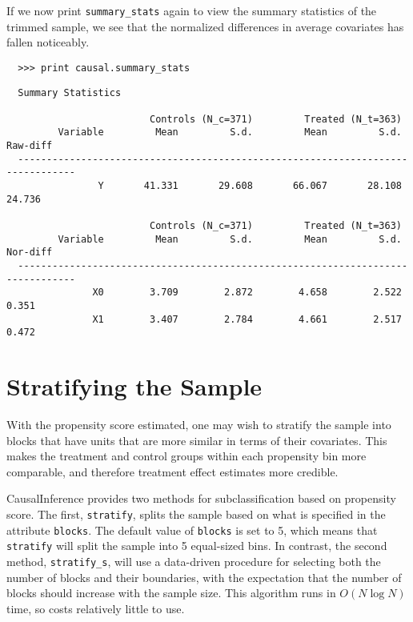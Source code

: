 \documentclass[12pt]{article}
\theoremstyle{definition}
\theoremstyle{definition}
\theoremstyle{definition}
\theoremstyle{remark}
\begin{document}
If we now print \texttt{summary\_stats} again to view the summary statistics of the trimmed sample, we see that the normalized differences in average covariates has fallen noticeably.
\begin{verbatim}
  >>> print causal.summary_stats
\end{verbatim}
\begin{verbatim}
  Summary Statistics
  
                         Controls (N_c=371)         Treated (N_t=363)             
         Variable         Mean         S.d.         Mean         S.d.     Raw-diff
  --------------------------------------------------------------------------------
                Y       41.331       29.608       66.067       28.108       24.736
  
                         Controls (N_c=371)         Treated (N_t=363)             
         Variable         Mean         S.d.         Mean         S.d.     Nor-diff
  --------------------------------------------------------------------------------
               X0        3.709        2.872        4.658        2.522        0.351
               X1        3.407        2.784        4.661        2.517        0.472
\end{verbatim}


\section{Stratifying the Sample} \label{sec.e}

With the propensity score estimated, one may wish to stratify the sample into blocks that have units that are more similar in terms of their covariates. This makes the treatment and control groups within each propensity bin more comparable, and therefore treatment effect estimates more credible.

CausalInference provides two methods for subclassification based on propensity score. The first, \texttt{stratify}, splits the sample based on what is specified in the attribute \texttt{blocks}. The default value of \texttt{blocks} is set to 5, which means that \texttt{stratify} will split the sample into 5 equal-sized bins. In contrast, the second method, \texttt{stratify\_s}, will use a data-driven procedure for selecting both the number of blocks and their boundaries, with the expectation that the number of blocks should increase with the sample size. This algorithm runs in $O(N \log N)$ time, so costs relatively little to use. 
\end{document}
